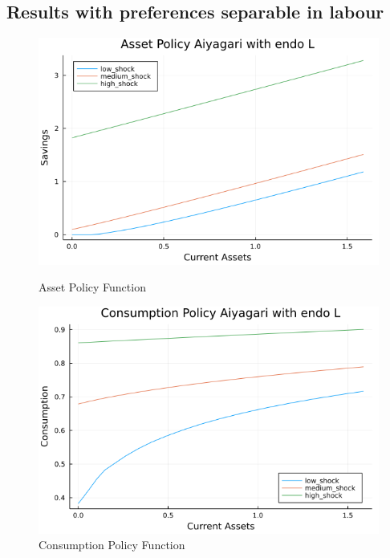 \documentclass[12pt]{article}
\begin{document}
\subsection{Results with preferences separable in labour}

\begin{figure}[h]
    \centering
    \begin{minipage}{0.45\textwidth}
        \centering
        \includegraphics[width=1\textwidth]{endoL_A_p.png} %
        \caption{Asset Policy Function}
    \end{minipage}\hfill
    \begin{minipage}{0.45\textwidth}
        \centering
        \includegraphics[width=1\textwidth]{endoL_C_p.png} %
        \caption{Consumption Policy Function}
    \end{minipage}
\end{figure}
\end{document}
